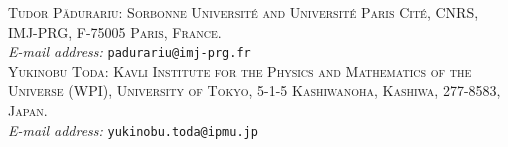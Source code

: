\documentclass [11pt,oneside,a4paper,mathscr]{amsart}
\theoremstyle{definition}
\begin{document}
    
    
    
    
    
    
    
    
    
    
    
    
    
    
    
    
    
    
    
    
    
    
    
    
    
    
    
    
    
    
    
    
    
    
    
    
    
    
    
    
    
    
    
    
    
    
    
    
    
    
    
    
    
    
    
    
    
    
    
    
    
    
    
    
    
    
    
    
    
    
    
    
    
    
    
    
    
    
    
    
    
    
    
    
    
    


 

\medskip


\textsc{\small Tudor P\u adurariu: Sorbonne Université and Université Paris Cité, CNRS, IMJ-PRG, F-75005 Paris, France.}\\
\textit{\small E-mail address:} \texttt{\small padurariu@imj-prg.fr}\\

\textsc{\small Yukinobu Toda: Kavli Institute for the Physics and Mathematics of the Universe (WPI), University of Tokyo, 5-1-5 Kashiwanoha, Kashiwa, 277-8583, Japan.}\\
\textit{\small E-mail address:} \texttt{\small yukinobu.toda@ipmu.jp}\\


 
\end{document}
